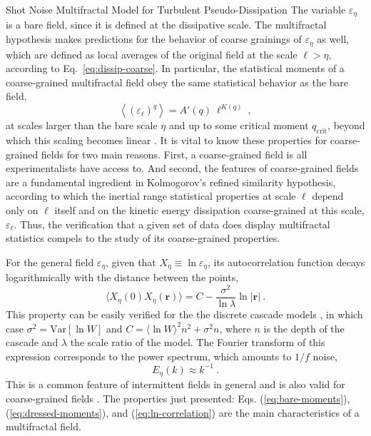 \begin{chapter}{Shot Noise Multifractal Model for Turbulent Pseudo-Dissipation}
The variable $\varepsilon_{\eta}$ is a bare field, since it is defined at the dissipative scale. The multifractal hypothesis makes predictions for the behavior of coarse grainings of $\varepsilon_{\eta}$ as well, which are defined as local averages of the original field at the scale $\ell > \eta$, according to Eq.~\eqref{eq:dissip-coarse}.
In particular, the statistical moments of a coarse-grained multifractal field obey the same statistical behavior as the bare field,
\begin{equation} \label{eq:dressed-moments}
\left\langle(\varepsilon_{\ell})^{q}\right\rangle = A'(q) \ \ell^{K(q)} \ ,
\end{equation}
at scales larger than the bare scale $\eta$ and up to some critical moment $q_{\mathrm{crit}}$, beyond which this scaling becomes linear \parencite{schmitt1994,lashermes2004}.
It is vital to know these properties for coarse-grained fields for two main reasons. First, a coarse-grained field is all experimentalists have access to. And second, the features of coarse-grained fields are a fundamental ingredient in Kolmogorov's refined similarity hypothesis, according to which the inertial range statistical properties at scale $\ell$ depend only on $\ell$ itself and on the kinetic energy dissipation coarse-grained at this scale, $\varepsilon_{\ell}$. Thus, the verification that a given set of data does display multifractal statistics compels to the study of its coarse-grained properties.

For the general field $\varepsilon_{\eta}$, given that $X_{\eta} \equiv \ln \varepsilon_{\eta}$, its autocorrelation function decays logarithmically with the distance between the points,
\begin{equation} \label{eq:ln-correlation}
\langle X_{\eta}(0) X_{\eta}(\boldsymbol{r}) \rangle = C - \frac{\sigma^2}{\ln \lambda} \ln |\boldsymbol{r}| \ .
\end{equation}
This property can be easily verified for the the discrete cascade models \parencite{arneodo1998prl,arneodo1998jmathphys,schmitt2003}, in which case $\sigma^2 = \mathrm{Var}[ \ln W ]$ and $C = \langle \ln W \rangle^2 n^2 + \sigma^2 n$, where $n$ is the depth of the cascade and $\lambda$ the scale ratio of the model.
The Fourier transform of this expression corresponds to the power spectrum, which amounts to $1/f$ noise,
\begin{equation}
E_{\eta}(k) \approx k^{-1} \ .
\end{equation}
This is a common feature of intermittent fields in general and is also valid for coarse-grained fields \parencite{schertzer1987,schertzer1991,bacry2001}.
The properties just presented: Eqs. (\ref{eq:bare-moments}), (\ref{eq:dressed-moments}), and (\ref{eq:ln-correlation}) are the main characteristics of a multifractal field.


\end{chapter}
